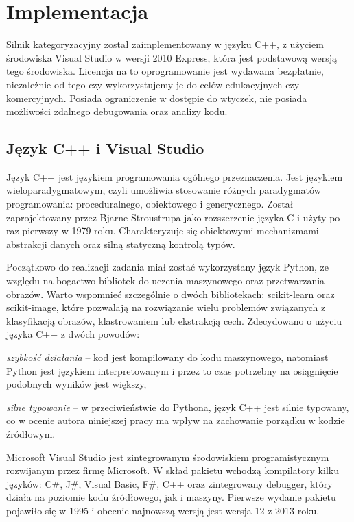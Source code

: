 \chapter{Implementacja}

Silnik kategoryzacyjny został zaimplementowany w języku C++, z użyciem środowiska Visual Studio w wersji 2010 Express, która jest podstawową wersją tego środowiska. Licencja na to oprogramowanie jest wydawana bezpłatnie, niezależnie od tego czy wykorzystujemy je do celów edukacyjnych czy komercyjnych. Posiada ograniczenie w dostępie do wtyczek, nie posiada możliwości zdalnego debugowania oraz analizy kodu.

\section{Język C++ i Visual Studio}

Język C++ jest językiem programowania ogólnego przeznaczenia. Jest językiem wieloparadygmatowym, czyli umożliwia stosowanie różnych paradygmatów programowania: proceduralnego, obiektowego i generycznego. Został zaprojektowany przez Bjarne Stroustrupa jako rozszerzenie języka C i użyty po raz pierwszy w 1979 roku. Charakteryzuje się obiektowymi mechanizmami abstrakcji danych oraz silną statyczną kontrolą typów.

Początkowo do realizacji zadania miał zostać wykorzystany język Python, ze względu na bogactwo bibliotek do uczenia maszynowego oraz przetwarzania obrazów. Warto wspomnieć szczególnie o dwóch bibliotekach: scikit-learn oraz scikit-image, które pozwalają na rozwiązanie wielu problemów związanych z klasyfikacją obrazów, klastrowaniem lub ekstrakcją cech. Zdecydowano o użyciu języka C++ z dwóch powodów:

\begin{compactitem}
	\item \emph{szybkość działania} -- kod jest kompilowany do kodu maszynowego, natomiast Python jest językiem interpretowanym i przez to czas potrzebny na osiągnięcie podobnych wyników jest większy,
	\item \emph{silne typowanie} -- w przeciwieństwie do Pythona, język C++ jest silnie typowany, co w ocenie autora niniejszej pracy ma wpływ na zachowanie porządku w kodzie źródłowym.
\end{compactitem}

Microsoft Visual Studio jest zintegrowanym środowiskiem programistycznym rozwijanym przez firmę Microsoft. W skład pakietu wchodzą kompilatory kilku języków: C\#, J\#, Visual Basic, F\#, C++ oraz zintegrowany debugger, który działa na poziomie kodu źródłowego, jak i maszyny. Pierwsze wydanie pakietu pojawiło się w 1995 i obecnie najnowszą wersją jest wersja 12 z 2013 roku. 

